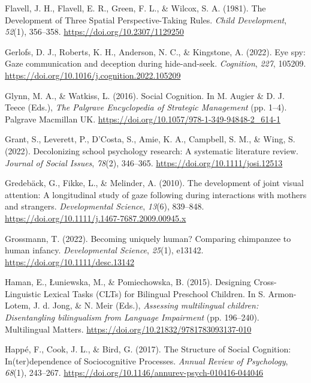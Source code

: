 \documentclass[
]{scrbook}
\newlength{\cslhangindent}
\newenvironment{CSLReferences}[2] %
 {\begin{list}{}{%
  \setlength{\itemindent}{0pt}
  \setlength{\leftmargin}{0pt}
  \setlength{\parsep}{0pt}
  \ifodd #1
   \setlength{\leftmargin}{\cslhangindent}
   \setlength{\itemindent}{-1\cslhangindent}
  \fi
  \setlength{\itemsep}{#2\baselineskip}}}
 {\end{list}}
\begin{document}
\begin{CSLReferences}{1}{0}
Flavell, J. H., Flavell, E. R., Green, F. L., \& Wilcox, S. A. (1981). The {Development} of {Three Spatial Perspective-Taking Rules}. \emph{Child Development}, \emph{52}(1), 356--358. \url{https://doi.org/10.2307/1129250}

Gerlofs, D. J., Roberts, K. H., Anderson, N. C., \& Kingstone, A. (2022). Eye spy: {Gaze} communication and deception during hide-and-seek. \emph{Cognition}, \emph{227}, 105209. \url{https://doi.org/10.1016/j.cognition.2022.105209}

Glynn, M. A., \& Watkiss, L. (2016). Social {Cognition}. In M. Augier \& D. J. Teece (Eds.), \emph{The {Palgrave Encyclopedia} of {Strategic Management}} (pp. 1--4). Palgrave Macmillan UK. \url{https://doi.org/10.1057/978-1-349-94848-2_614-1}

Grant, S., Leverett, P., D'Costa, S., Amie, K. A., Campbell, S. M., \& Wing, S. (2022). Decolonizing school psychology research: {A} systematic literature review. \emph{Journal of Social Issues}, \emph{78}(2), 346--365. \url{https://doi.org/10.1111/josi.12513}

Gredebäck, G., Fikke, L., \& Melinder, A. (2010). The development of joint visual attention: A longitudinal study of gaze following during interactions with mothers and strangers. \emph{Developmental Science}, \emph{13}(6), 839--848. \url{https://doi.org/10.1111/j.1467-7687.2009.00945.x}

Grossmann, T. (2022). Becoming uniquely human? {Comparing} chimpanzee to human infancy. \emph{Developmental Science}, \emph{25}(1), e13142. \url{https://doi.org/10.1111/desc.13142}

Haman, E., Łuniewska, M., \& Pomiechowska, B. (2015). Designing {Cross-Linguistic Lexical Tasks} ({CLTs}) for {Bilingual Preschool Children}. In S. Armon-Lotem, J. d. Jong, \& N. Meir (Eds.), \emph{Assessing multilingual children: {Disentangling} bilingualism from {Language Impairment}} (pp. 196--240). Multilingual Matters. \url{https://doi.org/10.21832/9781783093137-010}

Happé, F., Cook, J. L., \& Bird, G. (2017). The {Structure} of {Social Cognition}: {In}(ter)dependence of {Sociocognitive Processes}. \emph{Annual Review of Psychology}, \emph{68}(1), 243--267. \url{https://doi.org/10.1146/annurev-psych-010416-044046}


\end{CSLReferences}
\end{document}
